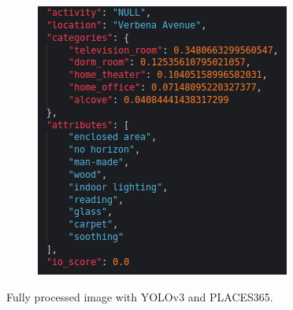 \begin{figure}[H]
\begin{subfigure}{0.49\textwidth}
      \includegraphics[width=\textwidth]{Sections/4InitialWork/4_images_random/process2.png}
      \end{subfigure}
      \caption{Fully processed image with YOLOv3 and PLACES365.}
      \label{fig:image_fully_processed}
      \end{figure}


